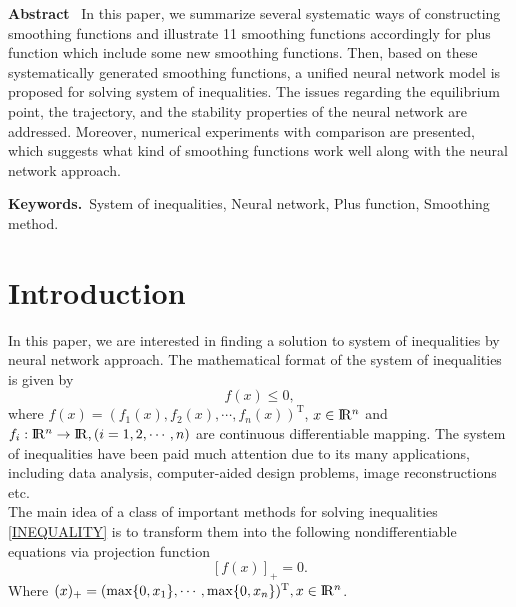 \documentclass[12pt]{article}
\renewcommand{\Re}{{\rm I}\! {\rm R}}
\newcommand{\rn}{\Re^n}
\begin{document}
 \medskip

 \noindent
 {\bf Abstract} \
 In this paper, we summarize several systematic ways of constructing smoothing
 functions and illustrate 11 smoothing functions accordingly for plus function
 which  include some new smoothing functions. Then, based on these systematically
 generated  smoothing functions, a unified neural network model is proposed for
 solving  system of inequalities. The issues regarding the equilibrium point, the
 trajectory, and the stability properties of the  neural network are addressed.
 Moreover, numerical experiments with comparison are presented, which suggests
 what kind of smoothing functions work well along  with the neural network approach.


 \vspace{0.8cm}

 \noindent
 {\bf Keywords.}\  System of inequalities, Neural network, Plus function, Smoothing method.

 \medskip


 \section{Introduction} \label{sec1}


 In this paper, we are interested in finding a solution to system of inequalities
  by neural network approach. The mathematical format of the system of inequalities is given by
 \begin{equation} \label{INEQUALITY}
 f(x) \leq 0,
 \end{equation}
 where $f(x)=( f_1(x),f_2(x),\cdots, f_n(x))^\mathrm{T}$,
 $ x \in \Re^{n }$ and $f_i:\Re^{n } \rightarrow \Re, (i=1,2,\cdots,n)$ are
 continuous differentiable mapping.
 The system of inequalities have been paid much attention due to its many applications,
 including data analysis, computer-aided design problems, image reconstructions etc.
   \\

The main idea of a class of important methods for solving inequalities \eqref{INEQUALITY} is to
transform them into the following nondifferentiable equations via projection function
\begin{equation}\label{plusf}
  [f (x)]_+ = 0.
\end{equation}
Where $(x)_+ = (\max\{0,x_1\},\cdots, \max\{0, x_n\})^\mathrm{T}, x \in \rn$.
\end{document}
